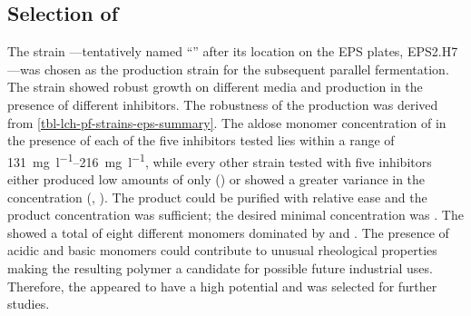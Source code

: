 \subsection{Selection of \strain{}\label{subsec-lch-eps-strain-selection-winner}}
The strain ---tentatively named \enquote{\strain{}} after its location on the EPS plates, EPS2.H7---was chosen as the \eps{} production strain for the subsequent parallel fermentation. The strain showed robust growth on different media and \eps{} production in the presence of different inhibitors. The robustness of the \eps{} production was derived from \vref{tbl-lch-pf-strains-eps-summary}. The aldose monomer concentration of  in the presence of each of the five inhibitors tested lies within a range of \SIrange{131}{216}{\milli\gram\per\litre}, while every other strain tested with five inhibitors either produced low amounts of \eps{} only () or showed a greater variance in the \eps{} concentration (, ). The product could be purified with relative ease and the product concentration was sufficient; the desired minimal concentration was . The \eps{} \amc{} showed a total of eight different monomers dominated by \glc{} and \man{}. The presence of acidic and basic monomers could contribute to unusual rheological properties making the resulting polymer a candidate for possible future industrial uses. Therefore, the \eps{} appeared to have a high potential and \strain{} was selected for further studies.

